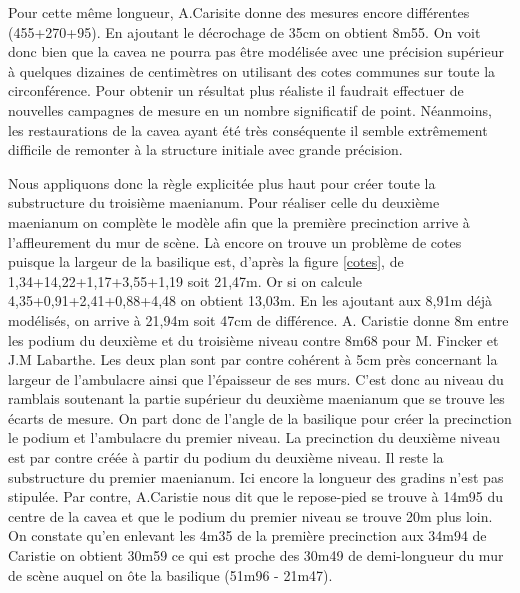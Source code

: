 Pour cette même longueur, A.Carisite donne des mesures encore différentes (455+270+95). En ajoutant le décrochage de 35cm on obtient 8m55. On voit donc bien que la cavea ne pourra pas être modélisée avec une précision supérieur à quelques dizaines de centimètres on utilisant des cotes communes sur toute la circonférence. Pour obtenir un résultat plus réaliste il faudrait effectuer de nouvelles campagnes de mesure en un nombre significatif de point. Néanmoins, les restaurations de la cavea ayant été très conséquente il semble extrêmement difficile de remonter à la structure initiale avec grande précision.

Nous appliquons donc la règle explicitée plus haut pour créer toute la substructure du troisième maenianum. Pour réaliser celle du deuxième maenianum on complète le modèle afin que la première precinction arrive à l'affleurement du mur de scène. Là encore on trouve un problème de cotes puisque la largeur de la basilique est, d'après la figure \ref{cotes}, de 1,34+14,22+1,17+3,55+1,19 soit 21,47m. Or si on calcule 4,35+0,91+2,41+0,88+4,48 on obtient 13,03m. En les ajoutant aux 8,91m déjà modélisés, on arrive à 21,94m soit 47cm de différence. A. Caristie donne 8m entre les podium du deuxième et du troisième niveau contre 8m68 pour M. Fincker et J.M Labarthe. Les deux plan sont par contre cohérent à 5cm près concernant la largeur de l'ambulacre ainsi que l'épaisseur de ses murs. C'est donc au niveau du ramblais soutenant la partie supérieur du deuxième maenianum que se trouve les écarts de mesure. On part donc de l'angle de la basilique pour créer la precinction le podium et l'ambulacre du premier niveau. La precinction du deuxième niveau est par contre créée à partir du podium du deuxième niveau. Il reste la substructure du premier maenianum. Ici encore la longueur des gradins n'est pas stipulée. Par contre, A.Caristie nous dit que le repose-pied se trouve à 14m95 du centre de la cavea et que le podium du premier niveau se trouve 20m plus loin. On constate qu'en enlevant les 4m35 de la première precinction aux 34m94 de Caristie on obtient 30m59 ce qui est proche des 30m49 de demi-longueur du mur de scène auquel on ôte la basilique (51m96 - 21m47).

